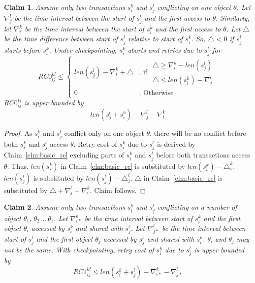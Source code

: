 \documentclass[preprint]{sigplanconf}
\newtheorem{clm}{Claim}
\begin{document}
\begin{clm}\label{clm:2_tx_cp_retry_cost}
Assume only two transactions $s_i^k$ and $s_j^l$ conflicting on one object $\theta$. Let $\nabla_{j}^{l}$ be the time interval between the start of $s_{j}^{l}$ and the first access to $\theta$. Similarly, let $\nabla_{i}^{k}$ be the time interval between the start of $s_i^k$ and the first access to $\theta$. Let $\triangle$ be the time difference between start of $s_j^l$ relative to start of $s_i^k$. So, $\triangle < 0$ if $s_j^l$ starts before $s_i^k$. Under checkpointing, $s_{i}^{k}$ aborts and retries due to $s_{j}^{l}$
for 
\begin{equation}
RC0_{ij}^{kl} \le \begin{cases}
len\left(s_{j}^{l}\right)-\nabla_{i}^{k}+\triangle & \mbox{, if }\begin{gathered}\triangle\ge\nabla_{i}^{k}-len\left(s_{j}^{l}\right)\\
\triangle\le len\left(s_{i}^{k}\right)-\nabla_{j}^{l}
\end{gathered}
\\
0 & \mbox{, Otherwise}
\end{cases}\label{eq:2_tx_cp_retry_cost}
\end{equation}
%
$RC0_{ij}^{kl}$ is upper bounded by 
\begin{equation}
len\left(s_{j}^{l}+s_{i}^{k}\right)-\nabla_{j}^{l}-\nabla_{i}^{k}\label{eq:rc0_upper_bound}
\end{equation}

\end{clm}
%
\begin{proof}
%
As $s_i^k$ and $s_j^l$ conflict only on one object $\theta$, there will be no conflict before both $s_i^k$ and $s_j^l$ access $\theta$. Retry cost of $s_i^k$ due to $s_j^l$ is derived by Claim~\ref{clm:basic_rc} excluding parts of $s_i^k$ and $s_j^l$ before both transactions access $\theta$. Thus, $len\left(s_i^k\right)$ in Claim~\ref{clm:basic_rc} is substituted by $len\left(s_i^k\right)-\triangle_i^k$. $len\left(s_j^l\right)$ is substituted by $len\left(s_j^l\right)-\triangle_j^l$. $\triangle$ in Claim~\ref{clm:basic_rc} is substituted by $\triangle+\nabla_j^l-\nabla_i^k$. Claim follows.
%
\end{proof}
%
\begin{clm}\label{clm:rc1_upper_bound}
%
Assume only two transactions $s_i^k$ and $s_j^l$ conflicting on a number of object $\theta_1,\,\theta_2\,...\,\theta_z$. Let $\nabla_{i*}^k$ be the time interval between start of $s_i^k$ and the first object $\theta_i$ accessed by $s_i^k$ and shared with $s_j^l$. Let $\nabla_{j*}^l$ be the time interval between start of $s_j^l$ and the first object $\theta_j$ accessed by $s_j^l$ and shared with $s_i^k$. $\theta_i$ and $\theta_j$ may not be the same. With checkpointing, retry cost of $s_i^k$ due to $s_j^l$ is upper bounded by 
%
\begin{equation}
RC1_{ij}^{kl} \le len\left(s_i^k+s_j^l\right)-\nabla_{i*}^k-\nabla_{j*}^l
\label{eq:rc1_upper_bound}
\end{equation}
%
\end{clm}
\end{document}
